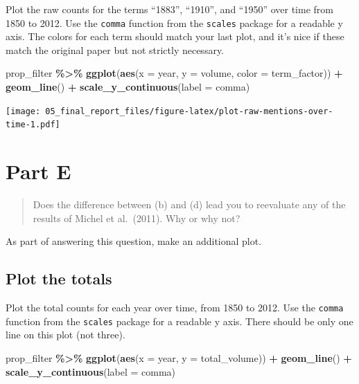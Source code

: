 \documentclass[
]{article}
\newenvironment{Shaded}{\begin{snugshade}}{\end{snugshade}}
\newcommand{\AttributeTok}[1]{\textcolor[rgb]{0.13,0.29,0.53}{#1}}
\newcommand{\FunctionTok}[1]{\textcolor[rgb]{0.13,0.29,0.53}{\textbf{#1}}}
\newcommand{\NormalTok}[1]{#1}
\newcommand{\SpecialCharTok}[1]{\textcolor[rgb]{0.81,0.36,0.00}{\textbf{#1}}}
\begin{document}
Plot the raw counts for the terms ``1883'', ``1910'', and ``1950'' over
time from 1850 to 2012. Use the \texttt{comma} function from the
\texttt{scales} package for a readable y axis. The colors for each term
should match your last plot, and it's nice if these match the original
paper but not strictly necessary.

\begin{Shaded}
\begin{Highlighting}[]
\NormalTok{prop\_filter }\SpecialCharTok{\%\textgreater{}\%} 
  \FunctionTok{ggplot}\NormalTok{(}\FunctionTok{aes}\NormalTok{(}\AttributeTok{x =}\NormalTok{ year, }\AttributeTok{y =}\NormalTok{ volume, }\AttributeTok{color =}\NormalTok{ term\_factor)) }\SpecialCharTok{+}
  \FunctionTok{geom\_line}\NormalTok{() }\SpecialCharTok{+}
  \FunctionTok{scale\_y\_continuous}\NormalTok{(}\AttributeTok{label =}\NormalTok{ comma)}
\end{Highlighting}
\end{Shaded}

\texttt{[image: 05\_final\_report\_files/figure-latex/plot-raw-mentions-over-time-1.pdf]}

\hypertarget{part-e}{%
\section{Part E}\label{part-e}}

\begin{quote}
Does the difference between (b) and (d) lead you to reevaluate any of
the results of Michel et al.~(2011). Why or why not?
\end{quote}

As part of answering this question, make an additional plot.

\hypertarget{plot-the-totals}{%
\subsection{Plot the totals}\label{plot-the-totals}}

Plot the total counts for each year over time, from 1850 to 2012. Use
the \texttt{comma} function from the \texttt{scales} package for a
readable y axis. There should be only one line on this plot (not three).

\begin{Shaded}
\begin{Highlighting}[]
\NormalTok{prop\_filter }\SpecialCharTok{\%\textgreater{}\%} 
  \FunctionTok{ggplot}\NormalTok{(}\FunctionTok{aes}\NormalTok{(}\AttributeTok{x =}\NormalTok{ year, }\AttributeTok{y =}\NormalTok{ total\_volume)) }\SpecialCharTok{+}
  \FunctionTok{geom\_line}\NormalTok{() }\SpecialCharTok{+}
  \FunctionTok{scale\_y\_continuous}\NormalTok{(}\AttributeTok{label =}\NormalTok{ comma)}
\end{Highlighting}
\end{Shaded}
\end{document}

